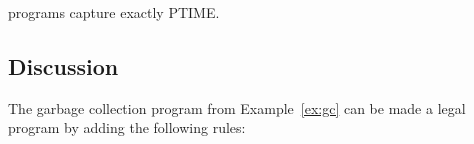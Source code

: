 \begin{corollary}
\label{cor:plang-ptime}
\plang programs capture exactly PTIME.
\end{corollary}




\subsection{Discussion}
The garbage collection program from Example~\ref{ex:gc} can be made
a legal \plang program by adding the following rules:

